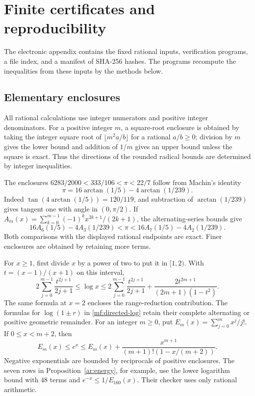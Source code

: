 \section{Finite certificates and reproducibility}\label{sec:certificates}

The electronic appendix contains the fixed rational inputs, verification
programs, a file index, and a manifest of SHA-256 hashes. The programs
recompute the inequalities from these inputs by the methods below.

\subsection{Elementary enclosures}

All rational calculations use integer numerators and positive integer
denominators. For a positive integer $m$, a square-root enclosure is
obtained by taking the integer square root of $\lfloor m^2a/b\rfloor$
for a rational $a/b\ge0$;
division by $m$ gives the lower bound and addition of $1/m$ gives
an upper bound unless the square is exact. Thus the directions of
the rounded radical bounds are determined by integer inequalities.

The enclosures $6283/2000<333/106<\pi<22/7$ follow from Machin's identity
\[
 \pi=16\arctan(1/5)-4\arctan(1/239).
\]
Indeed $\tan(4\arctan(1/5))=120/119$, and subtraction of
$\arctan(1/239)$ gives tangent one with angle in $(0,\pi/2)$.
If $A_m(x)=\sum_{k=0}^{m-1}(-1)^kx^{2k+1}/(2k+1)$, the
alternating-series bounds give
\[
 16A_6(1/5)-4A_3(1/239)<\pi
 <16A_7(1/5)-4A_2(1/239).
\]
Both comparisons with the displayed rational endpoints are exact.
Finer enclosures are obtained by retaining more terms.

For $x\ge1$, first divide $x$ by a power of two to put it in $[1,2)$.
With $t=(x-1)/(x+1)$ on this interval,
\[
 2\sum_{j=0}^{m-1}\frac{t^{2j+1}}{2j+1}
 \le\log x
 \le2\sum_{j=0}^{m-1}\frac{t^{2j+1}}{2j+1}
       +\frac{2t^{2m+1}}{(2m+1)(1-t^2)}.
\]
The same formula at $x=2$ encloses the range-reduction contribution.
The formulas for $\log(1\pm r)$ in
\eqref{mf:directed-log} retain their complete alternating or
positive geometric remainder. For an integer $m\ge0$, put
$E_m(x)=\sum_{j=0}^m x^j/j!$. If $0\le x<m+2$, then
\begin{equation}\label{ce:exp}
 E_m(x)\le e^x\le E_m(x)
                +\frac{x^{m+1}}{(m+1)!(1-x/(m+2))}.
\end{equation}
Negative exponentials are bounded by reciprocals of positive
enclosures. The seven rows in Proposition~\ref{ar:energy}, for
example, use the lower logarithm bound with $48$ terms and
$e^{-x}\le1/E_{160}(x)$. Their checker uses only rational arithmetic.

